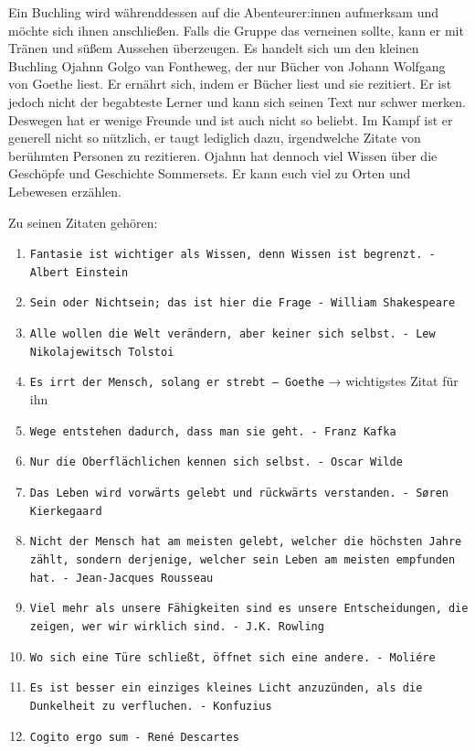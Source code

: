 \documentclass[11pt, twoside]{article}
\begin{document}
Ein Buchling wird währenddessen auf die Abenteurer:innen aufmerksam und möchte sich ihnen anschließen. Falls die Gruppe das verneinen sollte, kann er mit Tränen und süßem Aussehen überzeugen. Es handelt sich um den kleinen Buchling Ojahnn Golgo van Fontheweg, der nur Bücher von Johann Wolfgang von Goethe liest. Er ernährt sich, indem er Bücher liest und sie rezitiert. Er ist jedoch nicht der begabteste Lerner und kann sich seinen Text nur schwer merken. Deswegen hat er wenige Freunde und ist auch nicht so beliebt. Im Kampf ist er generell nicht so nützlich, er taugt lediglich dazu, irgendwelche Zitate von berühmten Personen zu rezitieren. Ojahnn hat dennoch viel Wissen über die Geschöpfe und Geschichte Sommersets. Er kann euch viel zu Orten und Lebewesen erzählen.

Zu seinen Zitaten gehören:
\begin{enumerate}
\item \texttt{Fantasie ist wichtiger als Wissen, denn Wissen ist begrenzt. - Albert Einstein}
\item \texttt{Sein oder Nichtsein; das ist hier die Frage - William Shakespeare}
\item \texttt{Alle wollen die Welt verändern, aber keiner sich selbst. - Lew Nikolajewitsch Tolstoi}
\item \texttt{Es irrt der Mensch, solang er strebt – Goethe} →  wichtigstes Zitat für ihn
\item \texttt{Wege entstehen dadurch, dass man sie geht. - Franz Kafka}
\item \texttt{Nur die Oberflächlichen kennen sich selbst. - Oscar Wilde}
\item \texttt{Das Leben wird vorwärts gelebt und rückwärts verstanden. - Søren Kierkegaard}
\item \texttt{Nicht der Mensch hat am meisten gelebt, welcher die höchsten Jahre zählt, sondern derjenige, welcher sein Leben am meisten empfunden hat. - Jean-Jacques Rousseau}
\item \texttt{Viel mehr als unsere Fähigkeiten sind es unsere Entscheidungen, die zeigen, wer wir wirklich sind. - J.K. Rowling}
\item \texttt{Wo sich eine Türe schließt, öffnet sich eine andere. - Moliére}
\item \texttt{Es ist besser ein einziges kleines Licht anzuzünden, als die Dunkelheit zu verfluchen. - Konfuzius}
\item \texttt{Cogito ergo sum - René Descartes}
\end{enumerate}
\end{document}
